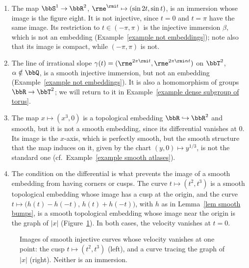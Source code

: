 \begin{example}\label{example immersions embeddings}
    \begin{enumerate}
        \item The map $\bbS^1\to\bbR^2$, $\rme^{\rmi t}\mapsto(\sin2t,\sin t)$, is an immersion whose image is the figure eight. It is not injective, since $t=0$ and $t=\pi$ have the same image. Its restriction to $t\in(-\pi,\pi)$ is the injective immersion $\beta$, which is not an embedding (Example~\ref{example not embeddings}); note also that its image is compact, while $(-\pi,\pi)$ is not.
        \item The line of irrational slope $\gamma(t)=(\rme^{2\pi\rmi t},\rme^{2\pi\rmi\alpha t})$ on $\bbT^2$, $\alpha\notin\bbQ$, is a smooth injective immersion, but not an embedding (Example~\ref{example not embeddings}). It is also a homomorphism of groups $\bbR\to\bbT^2$; we will return to it in Example~\ref{example dense subgroup of torus}.
        \item The map $x\mapsto(x^3,0)$ is a topological embedding $\bbR\hookrightarrow\bbR^2$ and smooth, but it is not a smooth embedding, since its differential vanishes at $0$. Its image is the $x$-axis, which is perfectly smooth, but the smooth structure that the map induces on it, given by the chart $(y,0)\mapsto y^{1/3}$, is not the standard one (cf.\ Example~\ref{example smooth atlases}).
        \item The condition on the differential is what prevents the image of a smooth embedding from having corners or cusps. The curve $t\mapsto(t^2,t^3)$ is a smooth topological embedding whose image has a cusp at the origin, and the curve $t\mapsto\big(h(t)-h(-t),\,h(t)+h(-t)\big)$, with $h$ as in Lemma~\ref{lem smooth bumps}, is a smooth topological embedding whose image near the origin is the graph of $\lvert x\rvert$ (Figure~\ref{fig cusp}). In both cases, the velocity vanishes at $t=0$.
    \end{enumerate}
\end{example}

\begin{figure}[tp]
    \centering
    \caption{Images of smooth injective curves whose velocity vanishes at one point: the cusp $t\mapsto(t^2,t^3)$ (left), and a curve tracing the graph of $\lvert x\rvert$ (right). Neither is an immersion.}
    \label{fig cusp}
\end{figure}

